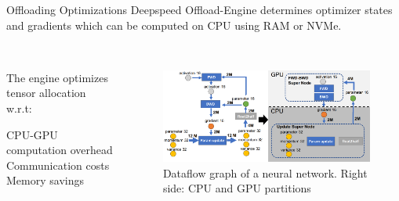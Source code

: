 \begin{frame}{Offloading Optimizations}
    Deepspeed Offload-Engine determines optimizer states and gradients which can be 
    computed on CPU using RAM or NVMe. \\~\\ 

    \begin{columns}
        \begin{column}{0.5\textwidth}
            \vspace{-0.75cm}
            \begin{center}
                \begin{small}
                    The engine optimizes tensor
                    allocation w.r.t:
                    \begin{itemize}
                        \bitem CPU-GPU computation overhead
                        \bitem Communication costs
                        \bitem Memory savings
                    \end{itemize}
                \end{small}
            \end{center}
        
        \end{column}
        \begin{column}{0.5\textwidth}
            \begin{center}
                \begin{figure}[H]
                    \includegraphics[scale=.17]{figures/data_flow_graph.png}
                    \caption*{\scriptsize Dataflow graph of a neural network. 
                    Right side: CPU and GPU partitions \footnotemark}
                \end{figure}
            \end{center}
        \end{column}
    \end{columns}
\end{frame}

